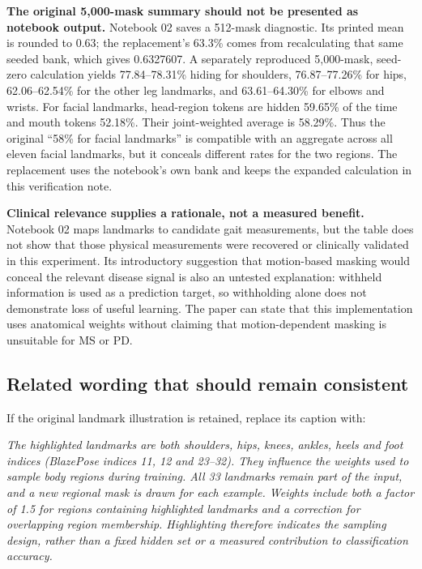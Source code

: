 \documentclass[
  11pt,
]{article}
\begin{document}
\textbf{The original 5,000-mask summary should not be presented as
notebook output.} Notebook 02 saves a 512-mask diagnostic. Its printed
mean is rounded to 0.63; the replacement's 63.3\% comes from
recalculating that same seeded bank, which gives 0.6327607. A separately
reproduced 5,000-mask, seed-zero calculation yields 77.84--78.31\%
hiding for shoulders, 76.87--77.26\% for hips, 62.06--62.54\% for the
other leg landmarks, and 63.61--64.30\% for elbows and wrists. For
facial landmarks, head-region tokens are hidden 59.65\% of the time and
mouth tokens 52.18\%. Their joint-weighted average is 58.29\%. Thus the
original ``58\% for facial landmarks'' is compatible with an aggregate
across all eleven facial landmarks, but it conceals different rates for
the two regions. The replacement uses the notebook's own bank and keeps
the expanded calculation in this verification note.

\textbf{Clinical relevance supplies a rationale, not a measured
benefit.} Notebook 02 maps landmarks to candidate gait measurements, but
the table does not show that those physical measurements were recovered
or clinically validated in this experiment. Its introductory suggestion
that motion-based masking would conceal the relevant disease signal is
also an untested explanation: withheld information is used as a
prediction target, so withholding alone does not demonstrate loss of
useful learning. The paper can state that this implementation uses
anatomical weights without claiming that motion-dependent masking is
unsuitable for MS or PD.

\subsection{Related wording that should remain
consistent}\label{related-wording-that-should-remain-consistent}

If the original landmark illustration is retained, replace its caption
with:

\emph{The highlighted landmarks are both shoulders, hips, knees, ankles,
heels and foot indices (BlazePose indices 11, 12 and 23--32). They
influence the weights used to sample body regions during training. All
33 landmarks remain part of the input, and a new regional mask is drawn
for each example. Weights include both a factor of 1.5 for regions
containing highlighted landmarks and a correction for overlapping region
membership. Highlighting therefore indicates the sampling design, rather
than a fixed hidden set or a measured contribution to classification
accuracy.}
\end{document}
